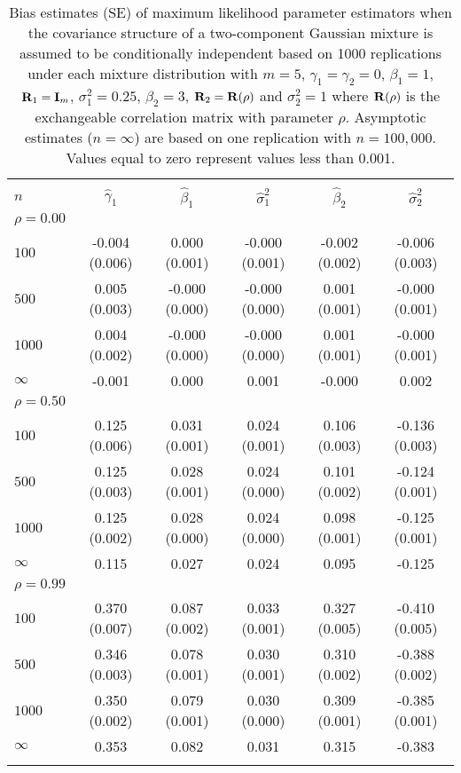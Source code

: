 \begin{table}[ht]
\centering
\begin{tabular}{lccccc}
   \thickhline \multicolumn{6}{c}{\textbf{Bias Estimates}}\\ $n$ & $\widehat{\gamma}_1$ & $\widehat{\beta}_1$ & $\widehat{\sigma}^2_1$ & $\widehat{\beta}_2$ & $\widehat{\sigma}^2_2$\\ 
   \hline$\rho=0.00$\\
    $100$ & -0.004 (0.006) & 0.000 (0.001) & -0.000 (0.001) & -0.002 (0.002) & -0.006 (0.003)\\ 
    $500$ & 0.005 (0.003) & -0.000 (0.000) & -0.000 (0.000) & 0.001 (0.001) & -0.000 (0.001)\\ 
    $1000$ & 0.004 (0.002) & -0.000 (0.000) & -0.000 (0.000) & 0.001 (0.001) & -0.000 (0.001)\\ 
    $\infty$ & -0.001 & 0.000 & 0.001 & -0.000 & 0.002\\ 
  $\rho = 0.50$\\
   $100$ & 0.125 (0.006) & 0.031 (0.001) & 0.024 (0.001) & 0.106 (0.003) & -0.136 (0.003)\\ 
    $500$ & 0.125 (0.003) & 0.028 (0.001) & 0.024 (0.000) & 0.101 (0.002) & -0.124 (0.001)\\ 
    $1000$ & 0.125 (0.002) & 0.028 (0.000) & 0.024 (0.000) & 0.098 (0.001) & -0.125 (0.001)\\ 
   $\infty$ & 0.115 & 0.027 & 0.024 & 0.095 & -0.125\\ 
  $\rho = 0.99$\\
   $100$ & 0.370 (0.007) & 0.087 (0.002) & 0.033 (0.001) & 0.327 (0.005) & -0.410 (0.005)\\ 
   $500$ & 0.346 (0.003) & 0.078 (0.001) & 0.030 (0.001) & 0.310 (0.002) & -0.388 (0.002)\\ 
   $1000$ & 0.350 (0.002) & 0.079 (0.001) & 0.030 (0.000) & 0.309 (0.001) & -0.385 (0.001)\\ 
   $\infty$ & 0.353 & 0.082 & 0.031 & 0.315 & -0.383 \\ 
   \thickhline\end{tabular}
\caption{Bias estimates (SE) of maximum likelihood parameter estimators when the covariance structure of a two-component Gaussian mixture is assumed to be conditionally independent based on 1000 replications under each mixture distribution with $m=5$, $\gamma_1=\gamma_2=0$, $\beta_{1}=1$, $\mathbf R_1=\mathbf I_{m}$, $\sigma_1^{2}=0.25$, $\beta_2=3$, $\mathbf R_2=\mathbf R(\rho)$ and $\sigma_2^{2}=1$ where $\mathbf R(\rho)$ is the exchangeable correlation matrix with parameter $\rho$. Asymptotic estimates ($n=\infty$) are based on one replication with $n=100,000$. Values equal to zero represent values less than 0.001.}
\label{tab:dep1}

\end{table}
